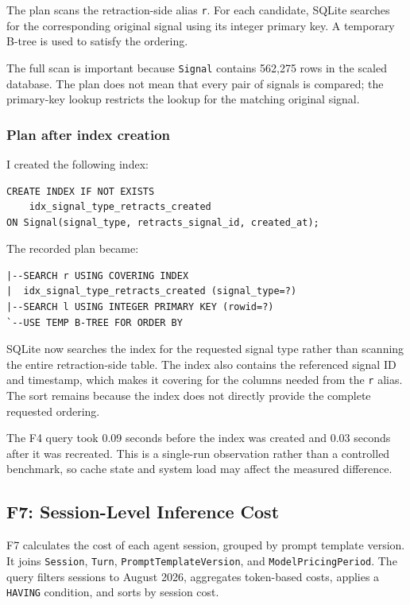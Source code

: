 \documentclass[11pt,a4paper]{article}
\begin{document}
The plan scans the retraction-side alias \texttt{r}. For each candidate,
SQLite searches for the corresponding original signal using its integer
primary key. A temporary B-tree is used to satisfy the ordering.

The full scan is important because \texttt{Signal} contains 562,275
rows in the scaled database. The plan does not mean that every pair
of signals is compared; the primary-key lookup restricts the lookup
for the matching original signal.

\subsubsection{Plan after index creation}

I created the following index:

\begin{lstlisting}[style=sqlstyle]
CREATE INDEX IF NOT EXISTS
    idx_signal_type_retracts_created
ON Signal(signal_type, retracts_signal_id, created_at);
\end{lstlisting}

The recorded plan became:

\begin{lstlisting}[style=textstyle]
|--SEARCH r USING COVERING INDEX
|  idx_signal_type_retracts_created (signal_type=?)
|--SEARCH l USING INTEGER PRIMARY KEY (rowid=?)
`--USE TEMP B-TREE FOR ORDER BY
\end{lstlisting}

SQLite now searches the index for the requested signal type rather
than scanning the entire retraction-side table. The index also contains
the referenced signal ID and timestamp, which makes it covering for
the columns needed from the \texttt{r} alias. The sort remains because
the index does not directly provide the complete requested ordering.

The F4 query took 0.09 seconds before the index was created
and 0.03 seconds after it was recreated. This is a single-run
observation rather than a controlled benchmark, so cache state
and system load may affect the measured difference.

\subsection{F7: Session-Level Inference Cost}

F7 calculates the cost of each agent session, grouped by prompt
template version. It joins \texttt{Session}, \texttt{Turn},
\texttt{PromptTemplateVersion}, and \texttt{ModelPricingPeriod}.
The query filters sessions to August 2026, aggregates token-based
costs, applies a \texttt{HAVING} condition, and sorts by session cost.
\end{document}
